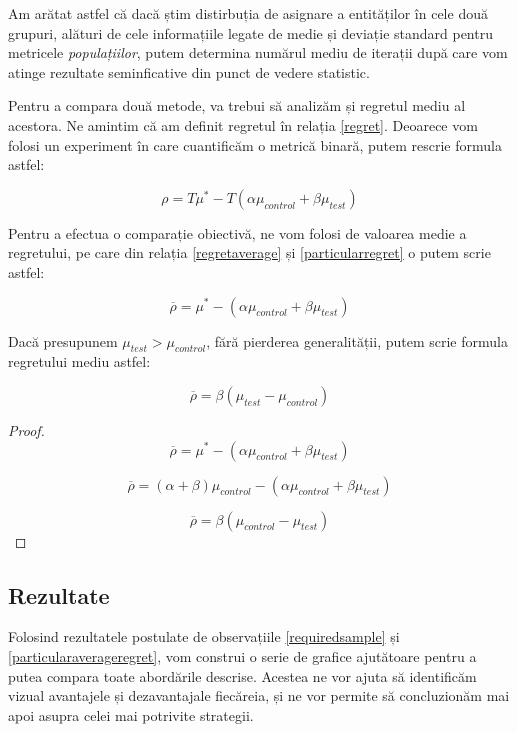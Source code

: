 Am arătat astfel că dacă știm distirbuția de asignare a entităților în cele două grupuri, alături de cele informațiile legate de medie și deviație standard pentru metricele \textit{populațiilor}, putem determina numărul mediu de iterații după care vom atinge rezultate seminficative din punct de vedere statistic.

Pentru a compara două metode, va trebui să analizăm și regretul mediu al acestora. Ne amintim că am definit regretul în relația \ref{regret}. Deoarece vom folosi un experiment în care cuantificăm o metrică binară, putem rescrie formula astfel:

\begin{equation}
\label{particularregret}
	\rho = T \mu^* - T(\alpha \mu_{control}  +  \beta \mu_{test})
\end{equation}

Pentru a efectua o comparație obiectivă, ne vom folosi de valoarea medie a regretului, pe care din relația \ref{regretaverage} și \ref{particularregret} o putem scrie astfel: 

\begin{equation}
\label{particularregretaverage}
	\overline{\rho} = \mu^* - (\alpha \mu_{control}  +  \beta  \mu_{test})
\end{equation}

\begin{theorem}
\label{particularaverageregret}
	Dacă presupunem $\mu_{test} > \mu_{control}$, fără pierderea generalității, putem scrie formula regretului mediu astfel:
	
	\[
		\overline{\rho} = \beta (\mu_{test} - \mu_{control})
	\]
\end{theorem}

\begin{proof}
	
	\[
		\overline{\rho} = \mu^* - (\alpha \mu_{control}  +  \beta  \mu_{test})
	\]
	
	\[
	\overline{\rho} = (\alpha + \beta)\mu_{control} - (\alpha \mu_{control}  +  \beta  \mu_{test})
	\]
	
	\[
	\overline{\rho} = \beta (\mu_{control} - \mu_{test})
	\]
\end{proof}

\subsection{Rezultate}

Folosind rezultatele postulate de observațiile \ref{requiredsample}  și \ref{particularaverageregret}, vom construi o serie de grafice ajutătoare pentru a putea compara toate abordările descrise. Acestea ne vor ajuta să identificăm vizual avantajele și dezavantajale fiecăreia, și ne vor permite să concluzionăm mai apoi asupra celei mai potrivite strategii.

